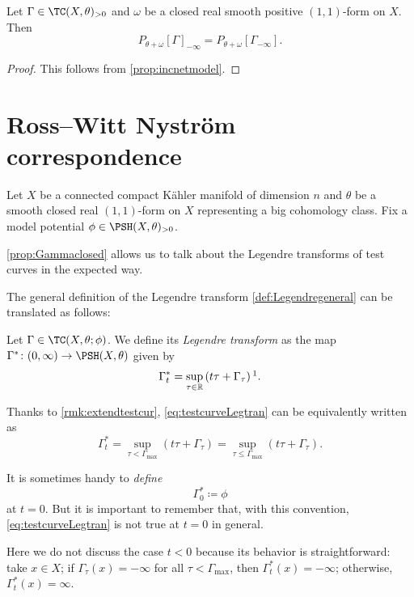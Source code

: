 \begin{proposition}\label{prop:PpreGammainf}
    Let $\Gamma\in \TC(X,\theta)_{>0}$ and $\omega$ be a closed real smooth positive $(1,1)$-form on $X$. Then
    \[
    P_{\theta+\omega}[\Gamma]_{-\infty}=P_{\theta+\omega}[\Gamma_{-\infty}].
    \]
\end{proposition}
\begin{proof}
     This follows from \cref{prop:incnetmodel}.
\end{proof}

\section{Ross--Witt Nystr\"om correspondence}\label{sec:RWN}
Let $X$ be a connected compact K\"ahler manifold of dimension $n$ and $\theta$ be a smooth closed real $(1,1)$-form on $X$ representing a big cohomology class.
Fix a model potential $\phi\in \PSH(X,\theta)_{>0}$.

\cref{prop:Gammaclosed} allows us to talk about the Legendre transforms of test curves in the expected way.

The general definition of the Legendre transform \cref{def:Legendregeneral} can be translated as follows:
\begin{definition}\label{def:Legtrans}
    Let $\Gamma\in \TC(X,\theta;\phi)$. We define its \emph{Legendre transform} as the map $\Gamma^*\colon (0,\infty)\rightarrow \PSH(X,\theta)$ given by
    \begin{equation}\label{eq:testcurveLegtran}
        \Gamma^*_t=\sup_{\tau\in \mathbb{R}} \left(t\tau+ \Gamma_{\tau}\right)\footnotemark.
    \end{equation}
\end{definition}
Thanks to \cref{rmk:extendtestcur}, \eqref{eq:testcurveLegtran} can be equivalently written as
\[
\Gamma^*_t=\sup_{\tau<\Gamma_{\max}} \left(t\tau+ \Gamma_{\tau}\right)=\sup_{\tau\leq \Gamma_{\max}} \left(t\tau+ \Gamma_{\tau}\right).
\]


It is sometimes handy to \emph{define}
\begin{equation}\label{eq:Gamma0star}
\Gamma^*_0\coloneqq \phi
\end{equation}
at $t=0$. But it is important to remember that, with this convention, \eqref{eq:testcurveLegtran} is not true at $t=0$ in general.

\begin{remark}\label{rmk:negativeray}
Here we do not discuss the case $t<0$ because its behavior is straightforward: take $x\in X$; if $\Gamma_{\tau}(x)=-\infty$ for all $\tau<\Gamma_{\max}$, then $\Gamma_t^*(x)=-\infty$; otherwise, $\Gamma_t^*(x)=\infty$.
\end{remark}

